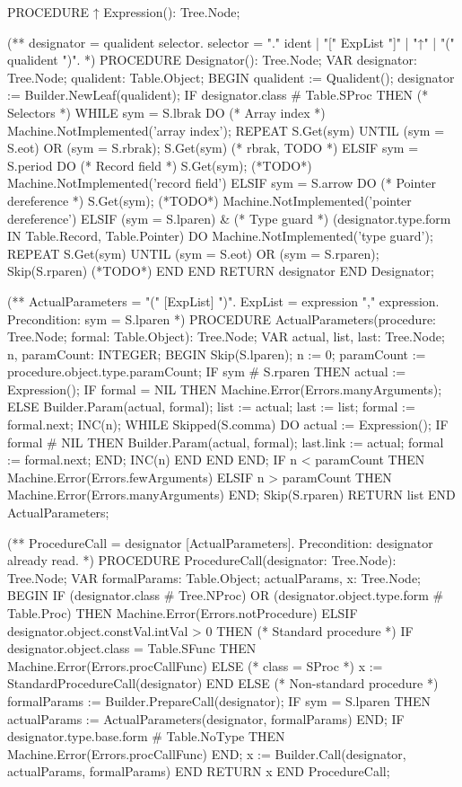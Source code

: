 \documentclass[utf8]{lgu}
\begin{document}
\begin{modula2long}
PROCEDURE ↑ Expression(): Tree.Node;

(** designator = qualident {selector}.
     selector = "." ident | "[" ExpList "]" | "↑" | "(" qualident ")". *)
PROCEDURE Designator(): Tree.Node;
VAR designator: Tree.Node;
  qualident: Table.Object;
BEGIN
  qualident := Qualident();
  designator := Builder.NewLeaf(qualident);
  IF designator.class # Table.SProc THEN
    (* Selectors *)
    WHILE sym = S.lbrak DO (* Array index *)
      Machine.NotImplemented('array index');
      REPEAT S.Get(sym) UNTIL (sym = S.eot) OR (sym = S.rbrak);
      S.Get(sym) (* rbrak, TODO *)
    ELSIF sym = S.period DO (* Record field *)
      S.Get(sym); (*TODO*)
      Machine.NotImplemented('record field')
    ELSIF sym = S.arrow DO (* Pointer dereference *)
      S.Get(sym); (*TODO*)
      Machine.NotImplemented('pointer dereference')
    ELSIF (sym = S.lparen) & (* Type guard *)
          (designator.type.form IN {Table.Record, Table.Pointer})
    DO
      Machine.NotImplemented('type guard');
      REPEAT S.Get(sym) UNTIL (sym = S.eot) OR (sym = S.rparen);
      Skip(S.rparen) (*TODO*)
    END
  END
RETURN designator END Designator;

(** ActualParameters = "(" [ExpList] ")".
     ExpList = expression {"," expression}.
     Precondition: sym = S.lparen *)
PROCEDURE ActualParameters(procedure: Tree.Node;
  formal: Table.Object): Tree.Node;
VAR actual, list, last: Tree.Node;
  n, paramCount: INTEGER;
BEGIN
  Skip(S.lparen);
  n := 0;
  paramCount := procedure.object.type.paramCount;
  IF sym # S.rparen THEN
    actual := Expression();
    IF formal = NIL THEN
      Machine.Error(Errors.manyArguments);
    ELSE
      Builder.Param(actual, formal);
      list := actual;
      last := list;
      formal := formal.next;
      INC(n);
      WHILE Skipped(S.comma) DO
        actual := Expression();
        IF formal # NIL THEN
          Builder.Param(actual, formal);
          last.link := actual;
          formal := formal.next;
        END;
        INC(n)
      END
    END
  END;
  IF n < paramCount THEN
    Machine.Error(Errors.fewArguments)
  ELSIF n > paramCount THEN
    Machine.Error(Errors.manyArguments)
  END;
  Skip(S.rparen)
RETURN list END ActualParameters;

(** ProcedureCall = designator [ActualParameters].
     Precondition: designator already read. *)
PROCEDURE ProcedureCall(designator: Tree.Node): Tree.Node;
VAR formalParams: Table.Object;
  actualParams, x: Tree.Node;
BEGIN
  IF (designator.class # Tree.NProc) OR
     (designator.object.type.form # Table.Proc) THEN
    Machine.Error(Errors.notProcedure)
  ELSIF designator.object.constVal.intVal > 0 THEN (* Standard procedure *)
    IF designator.object.class = Table.SFunc THEN
      Machine.Error(Errors.procCallFunc)
    ELSE (* class = SProc *)
      x := StandardProcedureCall(designator)
    END
  ELSE (* Non-standard procedure *)
    formalParams := Builder.PrepareCall(designator);
    IF sym = S.lparen THEN
      actualParams := ActualParameters(designator, formalParams)
    END;
    IF designator.type.base.form # Table.NoType THEN
      Machine.Error(Errors.procCallFunc)
    END;
    x := Builder.Call(designator, actualParams, formalParams)
  END
RETURN x END ProcedureCall;


\end{modula2long}
\end{document}
